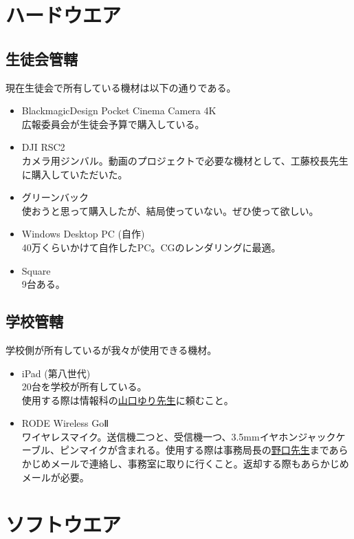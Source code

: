 \documentclass[a4paper]{ltjsreport}
\newcommand{\mail}[2]{\href{mailto:#2}{#1}}
\begin{document}
\section{ハードウエア}
\subsection{生徒会管轄}
現在生徒会で所有している機材は以下の通りである。
\begin{itemize}
  \item BlackmagicDesign Pocket Cinema Camera 4K\\
        広報委員会が生徒会予算で購入している。
  \item DJI RSC2\\
        カメラ用ジンバル。動画のプロジェクトで必要な機材として、工藤校長先生に購入していただいた。
  \item グリーンバック\\
        使おうと思って購入したが、結局使っていない。ぜひ使って欲しい。
  \item Windows Desktop PC (自作)\\
        40万くらいかけて自作したPC。CGのレンダリングに最適。
  \item Square\\
        9台ある。
\end{itemize}

\subsection{学校管轄}
学校側が所有しているが我々が使用できる機材。
\begin{itemize}
  \item iPad (第八世代)\\
        20台を学校が所有している。\\
        使用する際は情報科の\mail{山口ゆり先生}{yuri.yamaguchi@seiko.ac.jp}に頼むこと。
  \item RODE Wireless GoⅡ\\
        ワイヤレスマイク。送信機二つと、受信機一つ、3.5mmイヤホンジャックケーブル、ピンマイクが含まれる。使用する際は事務局長の\mail{野口先生}{noguchi@seiko.ac.jp}まであらかじめメールで連絡し、事務室に取りに行くこと。返却する際もあらかじめメールが必要。
\end{itemize}

\section{ソフトウエア}
\end{document}
